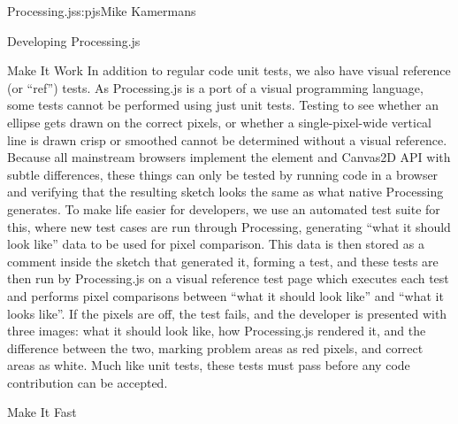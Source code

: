 \begin{aosachapter}{Processing.js}{s:pjs}{Mike Kamermans}
\begin{aosasect1}{Developing Processing.js}
\begin{aosasect2}{Make It Work}
In addition to regular code unit tests, we also have visual reference
(or ``ref'') tests. As Processing.js is a port of a visual programming
language, some tests cannot be performed using just unit
tests. Testing to see whether an ellipse gets drawn on the correct
pixels, or whether a single-pixel-wide vertical line is drawn crisp or
smoothed cannot be determined without a visual reference. Because all
mainstream browsers implement the
 element and Canvas2D API with
subtle differences, these things can only be tested by running code in
a browser and verifying that the resulting sketch looks the same as
what native Processing generates. To make life easier for developers,
we use an automated test suite for this, where new test cases are run
through Processing, generating ``what it should look like'' data to be
used for pixel comparison. This data is then stored as a comment
inside the sketch that generated it, forming a test, and these tests
are then run by Processing.js on a visual reference test page which
executes each test and performs pixel comparisons between ``what it
should look like'' and ``what it looks like''. If the pixels are off, the
test fails, and the developer is presented with three images:
what it should look like, how Processing.js
rendered it, and the difference between the two, marking
problem areas as red pixels, and correct areas as white. Much like
unit tests, these tests must pass before any code contribution can be
accepted.

\end{aosasect2}

\begin{aosasect2}{Make It Fast}


\end{aosasect2}
\end{aosasect1}
\end{aosachapter}
